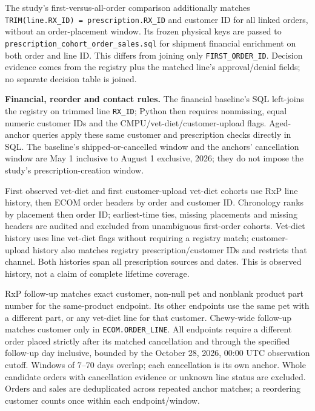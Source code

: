 The study's first-versus-all-order comparison additionally matches
\texttt{TRIM(line.RX\_ID) = prescription.RX\_ID} and customer ID for all linked
orders, without an order-placement window. Its frozen physical keys are passed
to \texttt{prescription\_cohort\_order\_sales.sql} for shipment financial enrichment
on both order and line ID. This differs from joining only
\texttt{FIRST\_ORDER\_ID}. Decision evidence comes from the registry plus the
matched line's approval/denial fields; no separate decision table is joined.

\noindent\textbf{Financial, reorder and contact rules.}
The financial baseline's SQL left-joins the registry on trimmed line
\texttt{RX\_ID}; Python then requires nonmissing, equal numeric customer IDs and
the CMPU/vet-diet/customer-upload flags. Aged-anchor queries apply these same
customer and prescription checks directly in SQL. The baseline's shipped-or-cancelled
window and the anchors' cancellation window are May 1 inclusive to August 1
exclusive, 2026; they do not impose the study's prescription-creation window.

First observed vet-diet and first customer-upload vet-diet cohorts use RxP line
history, then ECOM order headers by order and customer ID. Chronology ranks by
placement then order ID; earliest-time ties, missing placements and missing
headers are audited and excluded from unambiguous first-order cohorts. Vet-diet
history uses line vet-diet flags without requiring a registry match;
customer-upload history also matches registry prescription/customer IDs and
restricts that channel. Both histories span all prescription sources and dates. This is observed
history, not a claim of complete lifetime coverage.





RxP follow-up matches exact customer, non-null pet and nonblank product part
number for the same-product endpoint. Its other endpoints use the same pet with
a different part, or any vet-diet line for that customer. Chewy-wide follow-up
matches customer only in \texttt{ECOM.ORDER\_LINE}. All endpoints require a
different order placed strictly after its matched cancellation and through
the specified follow-up day inclusive, bounded by the October 28, 2026,
00:00 UTC observation cutoff. Windows of 7--70 days overlap; each cancellation
is its own anchor. Whole candidate orders with cancellation evidence or unknown
line status are excluded. Orders and sales are deduplicated across repeated
anchor matches; a reordering customer counts once within each endpoint/window.

